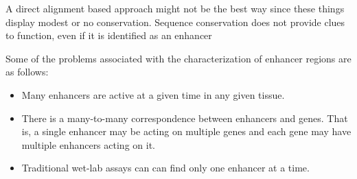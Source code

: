         
        A direct alignment based approach might not be the best way since these things display modest or no conservation. Sequence conservation does not provide clues to function, even if it is identified as an enhancer~\cite{pennacchio2013enhancers}
        
         Some of the problems associated with the characterization of enhancer regions are as follows:
        	\begin{itemize}
        		\item Many enhancers are active at a given time in any given tissue. 
        		\item There is a many-to-many correspondence between enhancers and genes. That is, a single enhancer may be acting on multiple genes and each gene may have multiple enhancers acting on it. 
        		\item Traditional wet-lab assays can can find only one enhancer at a time. 
        	\end{itemize}

        

            
        
        
            
            
